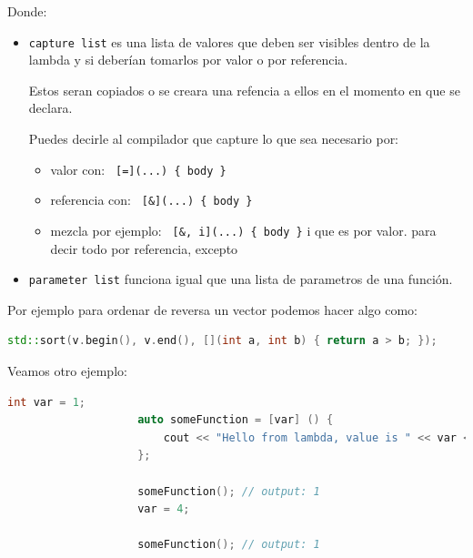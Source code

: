 \documentclass[12pt, fleqn]{report}                             %
\theoremstyle{break}                                            %
\newcommand{\textCode}[1]  { \texttt{#1} }                      %
\begin{document}
                Donde:
                \begin{itemize}
                    \item \textCode{capture list} es una lista de valores que deben ser visibles dentro
                        de la lambda y si deberían tomarlos por valor o por referencia.

                        Estos seran copiados o se creara una refencia a ellos en el momento en que se
                        declara.

                        Puedes decirle al compilador que capture lo que sea necesario por:
                        \begin{itemize}
                            \item valor con: \textCode{ [=](...) \{ body \}}
                            \item referencia con: \textCode{ [\&](...) \{ body \}}
                            \item mezcla  por ejemplo: \textCode{ [\&, i](...) \{ body \}}i que es por valor. 
                                para decir todo por referencia, excepto 
                        \end{itemize}

                        
                    \item \textCode{parameter list} funciona igual que una lista de parametros 
                        de una función.
                \end{itemize}

                Por ejemplo para ordenar de reversa un vector podemos hacer algo como:
                \begin{lstlisting}[language=C++, gobble=20]
                    std::sort(v.begin(), v.end(), [](int a, int b) { return a > b; });
                \end{lstlisting}
                
                \clearpage

                Veamos otro ejemplo:
                \begin{lstlisting}[language=C++, gobble=20]
                    int var = 1;
                    auto someFunction = [var] () { 
                        cout << "Hello from lambda, value is " << var << endl;
                    };

                    someFunction(); // output: 1
                    var = 4;

                    someFunction(); // output: 1
                \end{lstlisting}
\end{document}
